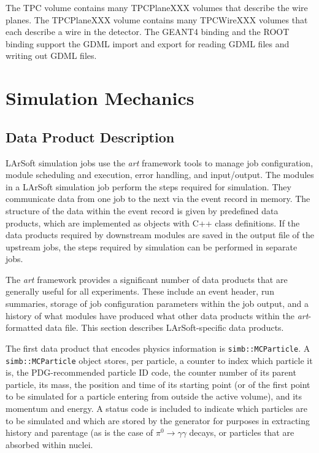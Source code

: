 \documentclass[12pt]{elsarticle}
\begin{document}
The TPC volume contains many TPCPlaneXXX volumes that describe the wire planes. The TPCPlaneXXX volume contains many TPCWireXXX volumes that each describe a wire in the detector. The GEANT4 binding and the ROOT binding support the GDML import and export for reading GDML files and writing out GDML files.
                    
\section{Simulation Mechanics}

\subsection{Data Product Description}

LArSoft simulation jobs use the {\it art} framework tools to manage
job configuration, module scheduling and execution, error handling, and input/output.
The modules in a LArSoft simulation job perform the steps required for simulation. 
They communicate data from one job to the next via the event record in memory. 
The structure of the data within the event record is given by predefined data products,
which are implemented as objects with C++ class definitions. 
If the data products required by downstream modules are saved in the output file of the
upstream jobs, the steps required by simulation can be performed in separate jobs.

The {\it art} framework provides a significant number of data products that are
generally useful for all experiments.  These include an event header, run summaries,
storage of job configuration parameters within the job output, and a history of what
modules have produced what other data products within the {\it art}-formatted data file.
This section describes LArSoft-specific data products.

The first data product that encodes physics information is {\tt simb::MCParticle}.  A {\tt simb::MCParticle}
object stores, per particle, a counter to index which particle it is,
the PDG-recommended particle ID code\cite{pdgcode}, the counter number of its parent particle,
its mass, the position and time of its starting point (or of the first point to be simulated
for a particle entering from outside the active volume), and its momentum and energy.
A status code is included to indicate which particles are to be simulated and which
are stored by the generator for purposes in extracting history and parentage (as is the
case of $\pi^0\rightarrow\gamma\gamma$ decays, or particles that are absorbed within
nuclei.
\end{document}
